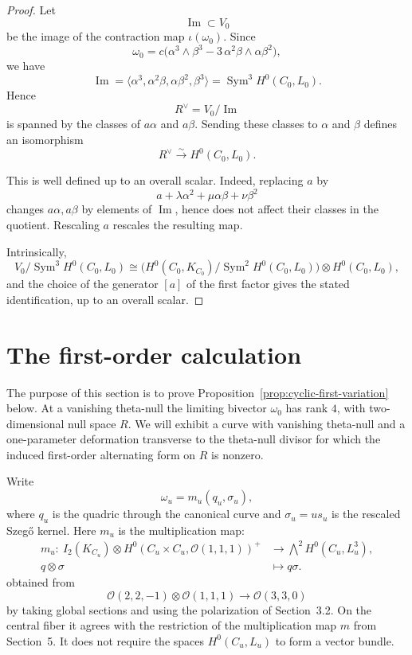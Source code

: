 \documentclass[11pt]{article}
\newcommand{\OO}{\mathcal O}
\newcommand{\Sym}{\operatorname{Sym}}
\begin{document}
\begin{proof}
Let
\[
\operatorname{Im}\subset V_0
\]
be the image of the contraction map \(\iota(\omega_0)\). Since
\[
{\omega_0=c\bigl(\alpha^3\wedge\beta^3-3\,\alpha^2\beta\wedge\alpha\beta^2\bigr),}
\]
we have
\[
\operatorname{Im}
=
\langle \alpha^3,\alpha^2\beta,\alpha\beta^2,\beta^3\rangle
=
\Sym^3 H^0(C_0,L_0).
\]
Hence
\[
R^\vee = V_0/\operatorname{Im}
\]
is spanned by the classes of \(a\alpha\) and \(a\beta\). Sending these classes to \(\alpha\) and \(\beta\) defines an isomorphism
\[
R^\vee \xrightarrow{\sim} H^0(C_0,L_0).
\]

This is well defined up to an overall scalar. Indeed, replacing \(a\) by
\[
a+\lambda \alpha^2+\mu \alpha\beta+\nu \beta^2
\]
changes \(a\alpha,a\beta\) by elements of \(\operatorname{Im}\), hence does not affect their classes in the quotient. Rescaling \(a\) rescales the resulting map.

Intrinsically,
\[
V_0/\operatorname{Sym}^3H^0(C_0,L_0)
\cong
\bigl(H^0(C_0,K_{C_0})/\operatorname{Sym}^2H^0(C_0,L_0)\bigr)
\otimes H^0(C_0,L_0),
\]
and the choice of the generator \([a]\) of the first factor gives the
stated identification, up to an overall scalar.

\end{proof}

\section{The first-order calculation}
\label{sec:first-order}

The purpose of this section is to prove Proposition~\ref{prop:cyclic-first-variation} below.
At a vanishing theta-null the limiting bivector $\omega_0$ has rank $4$,
with two-dimensional null space $R$.
We will exhibit a curve with vanishing theta-null
and a one-parameter deformation transverse to the theta-null divisor
for which the induced first-order alternating form on $R$ is nonzero.

Write
\begin{equation}
\label{eq:omega-family}
\omega_u=m_u(q_u,\sigma_u),
\end{equation}
where $q_u$ is the quadric through the canonical curve and
$\sigma_u=u s_u$ is the rescaled Szeg\H{o} kernel.
\begingroup
{Here $m_u$ is the multiplication map:}
\[
\begin{aligned}
m_u:\ I_2(K_{C_u})\otimes
H^0(C_u\times C_u,\OO(1,1,1))^+
&\longrightarrow \bigwedge\nolimits^2H^0(C_u,L_u^3),\\
q\otimes\sigma&\longmapsto q\sigma.
\end{aligned}
\]
{obtained from}
\[
\OO(2,2,-1)\otimes\OO(1,1,1)\to\OO(3,3,0)
\]
{by taking global sections}
and using the polarization of Section~3.2.
On the central fiber it agrees with the restriction of the multiplication
map $m$ from Section~5. It does not require the spaces $H^0(C_u,L_u)$
to form a vector bundle.
\endgroup
\end{document}
